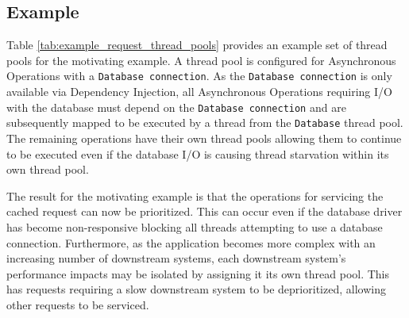 \documentclass[prodmode]{style/acmlarge}
\begin{document}
\subsection{Example}

Table \ref{tab:example_request_thread_pools} provides an example set of thread
pools for the motivating example.  A thread pool is configured for Asynchronous
Operations with a \texttt{Database connection}.  As the \texttt{Database
connection} is only available via Dependency Injection, all Asynchronous
Operations requiring I/O with the database must depend on the \texttt{Database
connection} and are subsequently mapped to be executed by a thread from the
\texttt{Database} thread pool.  The remaining operations have their own thread
pools allowing them to continue to be executed even if the database I/O is
causing thread starvation within its own thread pool.

\begin{table}[t]
\label{tab:example_request_thread_pools}
\end{table}

The result for the motivating example is that the operations for servicing the
cached request can now be prioritized.  This can occur even if the database
driver has become non-responsive blocking all threads attempting to use a
database connection.  Furthermore, as the application becomes more complex with
an increasing number of downstream systems, each downstream system's performance
impacts may be isolated by assigning it its own thread pool.  This has requests
requiring a slow downstream system to be deprioritized, allowing other requests
to be serviced.
\end{document}
